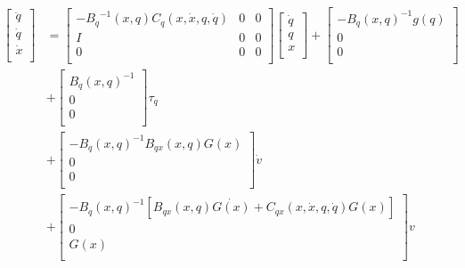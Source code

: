 \begin{equation}
	\begin{split}
			\left[\begin{matrix}\ddot{q}\\\dot{q}\\\dot{x}\\\end{matrix}\right]&=\left[\begin{matrix}-{B_q}^{-1}(x,q)C_q(x,\dot{x},q,\dot{q})&0&0\\I&0&0\\0&0&0\\\end{matrix}\right]\left[\begin{matrix}\dot{q}\\q\\x\\\end{matrix}\right]+\left[\begin{matrix}{{-B}_q(x,q)}^{-1}g(q)\\0\\0\\\end{matrix}\right]\\&+\left[\begin{matrix}{B_q(x,q)}^{-1}\\0\\0\\\end{matrix}\right]\tau_q\\&+\left[\begin{matrix}-{B_q(x,q)}^{-1}B_{qx}(x,q)G(x)\\0\\0\\\end{matrix}\right]\dot{v}\\&+\left[\begin{matrix}-{B_q(x,q)}^{-1}\left[B_{qx}(x,q)\dot{G(x)}+C_{qx}(x,\dot{x},q,\dot{q})G(x)\right]\\0\\G(x)\\\end{matrix}\right]v 
	\end{split}
\end{equation}


